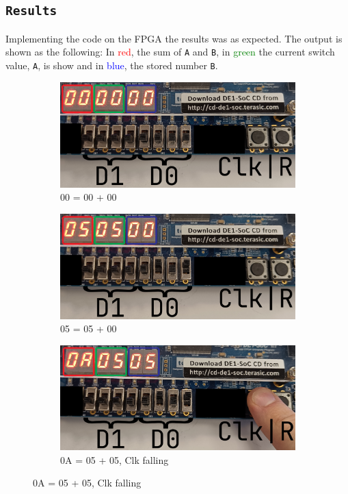 \documentclass{article}
\let\oldsubsection\subsection
\renewcommand{\subsection}[1]{%
  \oldsubsection{\texttt{#1}}%
  \setcounter{subsubsection}{-1}%
}
\begin{document}
\subsection{Results}
Implementing the code on the FPGA the results was as expected. The output is shown as the following: In \textcolor{red}{red}, the sum of \verb|A| and \verb|B|, in \textcolor{green}{green} the current switch value, \verb|A|, is show and in \textcolor{blue}{blue}, the stored number \verb|B|.

\clearpage
\begin{figure}[h]
    \centering
    \begin{subfigure}[t]{0.7\textwidth}
        \centering
        \includegraphics[width=1\textwidth]{Figures/Part5_1.jpg}
        \caption{00 = 00 + 00}
        \label{fig:p5_1}
    \end{subfigure}

    \begin{subfigure}[t]{0.7\textwidth}
        \centering
        \includegraphics[width=1\textwidth]{Figures/Part5_2.jpg}
        \caption{05 = 05 + 00}
        \label{fig:p5_2}
    \end{subfigure}
    
    \begin{subfigure}[t]{0.7\textwidth}
        \centering
        \includegraphics[width=1\textwidth]{Figures/Part5_3.jpg}
        \caption{0A = 05 + 05, Clk falling}
        \label{fig:p5_3}
    \end{subfigure}


\end{figure}
\end{document}
